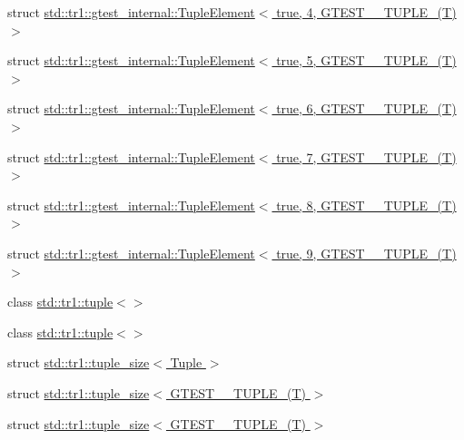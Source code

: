 \begin{DoxyCompactItemize}
\item 
struct \hyperlink{structstd_1_1tr1_1_1gtest__internal_1_1_tuple_element_3_01true_00_014_00_01_g_t_e_s_t__10___t_u_p_l_e___07_t_08_01_4}{std\+::tr1\+::gtest\+\_\+internal\+::\+Tuple\+Element$<$ true, 4, G\+T\+E\+S\+T\+\_\+\_\+\+T\+U\+P\+L\+E\+\_\+(\+T) $>$}
\item 
struct \hyperlink{structstd_1_1tr1_1_1gtest__internal_1_1_tuple_element_3_01true_00_015_00_01_g_t_e_s_t__10___t_u_p_l_e___07_t_08_01_4}{std\+::tr1\+::gtest\+\_\+internal\+::\+Tuple\+Element$<$ true, 5, G\+T\+E\+S\+T\+\_\+\_\+\+T\+U\+P\+L\+E\+\_\+(\+T) $>$}
\item 
struct \hyperlink{structstd_1_1tr1_1_1gtest__internal_1_1_tuple_element_3_01true_00_016_00_01_g_t_e_s_t__10___t_u_p_l_e___07_t_08_01_4}{std\+::tr1\+::gtest\+\_\+internal\+::\+Tuple\+Element$<$ true, 6, G\+T\+E\+S\+T\+\_\+\_\+\+T\+U\+P\+L\+E\+\_\+(\+T) $>$}
\item 
struct \hyperlink{structstd_1_1tr1_1_1gtest__internal_1_1_tuple_element_3_01true_00_017_00_01_g_t_e_s_t__10___t_u_p_l_e___07_t_08_01_4}{std\+::tr1\+::gtest\+\_\+internal\+::\+Tuple\+Element$<$ true, 7, G\+T\+E\+S\+T\+\_\+\_\+\+T\+U\+P\+L\+E\+\_\+(\+T) $>$}
\item 
struct \hyperlink{structstd_1_1tr1_1_1gtest__internal_1_1_tuple_element_3_01true_00_018_00_01_g_t_e_s_t__10___t_u_p_l_e___07_t_08_01_4}{std\+::tr1\+::gtest\+\_\+internal\+::\+Tuple\+Element$<$ true, 8, G\+T\+E\+S\+T\+\_\+\_\+\+T\+U\+P\+L\+E\+\_\+(\+T) $>$}
\item 
struct \hyperlink{structstd_1_1tr1_1_1gtest__internal_1_1_tuple_element_3_01true_00_019_00_01_g_t_e_s_t__10___t_u_p_l_e___07_t_08_01_4}{std\+::tr1\+::gtest\+\_\+internal\+::\+Tuple\+Element$<$ true, 9, G\+T\+E\+S\+T\+\_\+\_\+\+T\+U\+P\+L\+E\+\_\+(\+T) $>$}
\item 
class \hyperlink{classstd_1_1tr1_1_1tuple_3_4}{std\+::tr1\+::tuple$<$$>$}
\item 
class \hyperlink{classstd_1_1tr1_1_1tuple}{std\+::tr1\+::tuple$<$$>$}
\item 
struct \hyperlink{structstd_1_1tr1_1_1tuple__size}{std\+::tr1\+::tuple\+\_\+size$<$ Tuple $>$}
\item 
struct \hyperlink{structstd_1_1tr1_1_1tuple__size_3_01_g_t_e_s_t__0___t_u_p_l_e___07_t_08_01_4}{std\+::tr1\+::tuple\+\_\+size$<$ G\+T\+E\+S\+T\+\_\+\_\+\+T\+U\+P\+L\+E\+\_\+(\+T) $>$}
\item 
struct \hyperlink{structstd_1_1tr1_1_1tuple__size_3_01_g_t_e_s_t__1___t_u_p_l_e___07_t_08_01_4}{std\+::tr1\+::tuple\+\_\+size$<$ G\+T\+E\+S\+T\+\_\+\_\+\+T\+U\+P\+L\+E\+\_\+(\+T) $>$}

\end{DoxyCompactItemize}
